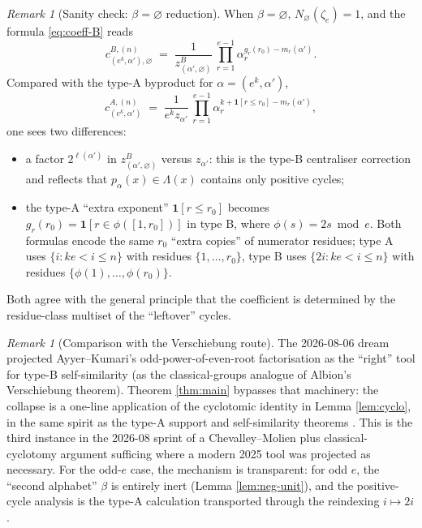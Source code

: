 \documentclass[11pt]{article}
\theoremstyle{remark}
\newtheorem{remark}[theorem]{Remark}
\newcommand{\zetae}{\zeta_e}
\newcommand{\one}{\mathbf{1}}
\newcommand{\emptyy}{\varnothing}
\newcommand{\zB}{z^{B}}
\begin{document}
\begin{remark}[Sanity check: $\beta = \emptyy$ reduction]\label{rmk:sanity}
When $\beta = \emptyy$, $N_\emptyy(\zetae) = 1$, and the formula \eqref{eq:coeff-B} reads
\[
  c^{B, (n)}_{(e^{k}, \alpha'), \emptyy} \;=\; \frac{1}{\zB_{(\alpha', \emptyy)}}\, \prod_{r=1}^{e-1}\alpha_r^{g_r(r_0) - m_r(\alpha')}.
\]
Compared with the type-A byproduct \cite{Cli26-support} for $\alpha = (e^{k}, \alpha')$,
\[
  c^{A, (n)}_{(e^{k}, \alpha')} \;=\; \frac{1}{e^{k} z_{\alpha'}}\, \prod_{r=1}^{e-1}\alpha_r^{k + \one[r \le r_0] - m_r(\alpha')},
\]
one sees two differences:
\begin{itemize}
  \item a factor $2^{\ell(\alpha')}$ in $\zB_{(\alpha', \emptyy)}$ versus $z_{\alpha'}$: this is the type-B centraliser correction and reflects that $p_\alpha(x) \in \Lambda(x)$ contains only positive cycles;
  \item the type-A ``extra exponent'' $\one[r \le r_0]$ becomes $g_r(r_0) = \one[r \in \phi([1, r_0])]$ in type B, where $\phi(s) = 2s \bmod e$. Both formulas encode the same $r_0$ ``extra copies'' of numerator residues; type A uses $\{i : ke < i \le n\}$ with residues $\{1, \ldots, r_0\}$, type B uses $\{2i : ke < i \le n\}$ with residues $\{\phi(1), \ldots, \phi(r_0)\}$.
\end{itemize}
Both agree with the general principle that the coefficient is determined by the residue-class multiset of the ``leftover'' cycles.
\end{remark}

\begin{remark}[Comparison with the Verschiebung route]\label{rmk:verschiebung}
The 2026-08-06 dream projected Ayyer--Kumari's odd-power-of-even-root factorisation \cite{AK26} as the ``right'' tool for type-B self-similarity (as the classical-groups analogue of Albion's Verschiebung theorem). Theorem \ref{thm:main} bypasses that machinery: the collapse is a one-line application of the cyclotomic identity in Lemma \ref{lem:cyclo}, in the same spirit as the type-A support and self-similarity theorems \cite{Cli26-support, Cli26-selfsim}. This is the third instance in the 2026-08 sprint of a Chevalley--Molien plus classical-cyclotomy argument sufficing where a modern 2025 tool was projected as necessary. For the odd-$e$ case, the mechanism is transparent: for odd $e$, the ``second alphabet'' $\beta$ is entirely inert (Lemma \ref{lem:neg-unit}), and the positive-cycle analysis is the type-A calculation transported through the reindexing $i \mapsto 2i$.
\end{remark}
\end{document}
